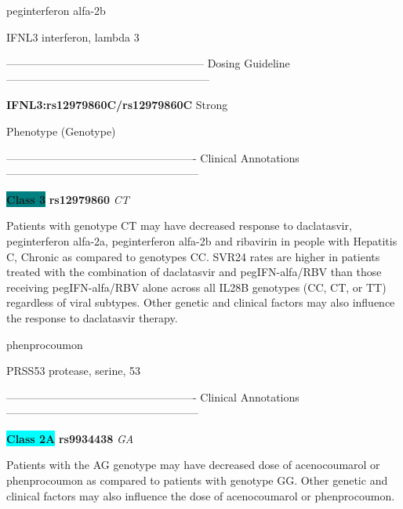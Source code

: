 \documentclass{resume} %
\begin{document}
\begin{rSection}{ peginterferon alfa-2b }
\begin{rSubsection}{ IFNL3 }{ interferon, lambda 3 }{}{}
\item[]
\item[] ------------------------------------------------------ Dosing Guideline --------------------------------------------------------\newline
\item[] \textbf{ IFNL3:rs12979860C/rs12979860C } Strong
\item[] Phenotype (Genotype)\newline
\item[] 
\item[] ---------------------------------------------------- Clinical Annotations -----------------------------------------------------\newline
\item \textbf{\colorbox{teal} {Class 3}} \textbf{ rs12979860 } \textit{ CT }
\item[] Patients with genotype CT may have decreased response to daclatasvir, peginterferon alfa-2a, peginterferon alfa-2b and ribavirin in people with Hepatitis C, Chronic as compared to genotypes CC. SVR24 rates are higher in patients treated with the combination of daclatasvir and pegIFN-alfa/RBV than those receiving pegIFN-alfa/RBV alone across all IL28B genotypes (CC, CT, or TT) regardless of viral subtypes. Other genetic and clinical factors may also influence the response to daclatasvir therapy.
\end{rSubsection}

\end{rSection}\begin{rSection}{ phenprocoumon }
\item[]

\begin{rSubsection}{ PRSS53 }{ protease, serine, 53 }{}{}
\item[]

\item[] ---------------------------------------------------- Clinical Annotations -----------------------------------------------------\newline
\item \textbf{\colorbox{cyan} {Class 2A}} \textbf{ rs9934438 } \textit{ GA }
\item[] Patients with the AG genotype may have decreased dose of acenocoumarol or phenprocoumon as compared to patients with genotype GG. Other genetic and clinical factors may also influence the dose of acenocoumarol or phenprocoumon.
\end{rSubsection}


\end{rSection}
\end{document}
